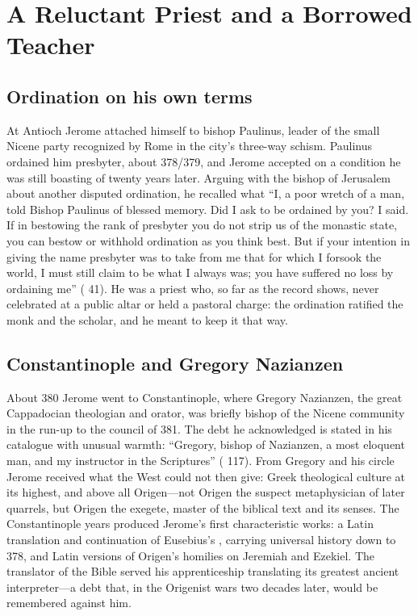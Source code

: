 \section{A Reluctant Priest and a Borrowed Teacher}

\subsection{Ordination on his own terms}

At Antioch Jerome attached himself to bishop Paulinus, leader of the small
Nicene party recognized by Rome in the city's three-way schism. Paulinus
ordained him presbyter, about 378/379, and Jerome accepted on a condition he
was still boasting of twenty years later. Arguing with the bishop of Jerusalem
about another disputed ordination, he recalled what ``I, a poor wretch of a
man, told Bishop Paulinus of blessed memory. Did I ask to be ordained by you?
I said. If in bestowing the rank of presbyter you do not strip us of the
monastic state, you can bestow or withhold ordination as you think best. But
if your intention in giving the name presbyter was to take from me that for
which I forsook the world, I must still claim to be what I always was; you
have suffered no loss by ordaining me'' ( 41). He was a priest who, so far as the record shows, never
celebrated at a public altar or held a pastoral charge: the ordination
ratified the monk and the scholar, and he meant to keep it that way.

\subsection{Constantinople and Gregory Nazianzen}

About 380 Jerome went to Constantinople, where Gregory Nazianzen, the great
Cappadocian theologian and orator, was briefly bishop of the Nicene community
in the run-up to the council of 381. The debt he acknowledged is stated in his
catalogue with unusual warmth: ``Gregory, bishop of Nazianzen, a most eloquent
man, and my instructor in the Scriptures'' ( 117).
From Gregory and his circle Jerome received what the West could not then give:
Greek theological culture at its highest, and above all Origen---not Origen
the suspect metaphysician of later quarrels, but Origen the exegete, master
of the biblical text and its senses. The Constantinople years produced
Jerome's first characteristic works: a Latin translation and continuation of
Eusebius's , carrying universal history down to 378, and
Latin versions of Origen's homilies on Jeremiah and Ezekiel. The translator
of the Bible served his apprenticeship translating its greatest ancient
interpreter---a debt that, in the Origenist wars two decades later, would be
remembered against him.
